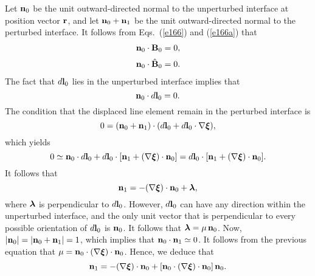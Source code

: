 \documentclass[12pt,prb,aps,notitlepage]{revtex4-1}
\newcommand{\bxi}{\mbox{\boldmath$\xi$}}
\newcommand{\blambda}{\mbox{\boldmath$\lambda$}}
\begin{document}
Let ${\bf n}_0$ be the unit outward-directed normal to the unperturbed interface at position vector ${\bf r}$, and let
${\bf n}_0+{\bf n}_1$ be the unit outward-directed normal to the perturbed interface. It follows from Eqs.~(\ref{e166}) and (\ref{e166a})
that
\begin{align}\label{e166x}
{\bf n}_0\cdot{\bf B}_0 &=0,\\[0.5ex]
{\bf n}_0\cdot\hat{\bf B}_0 &=0.\label{e166ax}
\end{align}
 The fact that $d{\bf l}_0$ lies
in the unperturbed interface implies that
\begin{equation}
{\bf n}_0\cdot d{\bf l}_0=0.
\end{equation}
The condition that the displaced
line element remain in the perturbed interface is
\begin{equation}
0=({\bf n}_0+{\bf n}_1)\cdot( d{\bf l}_0 + d{\bf l}_0\cdot\nabla\bxi),
\end{equation}
which yields
\begin{equation}
0\simeq {\bf n}_0\cdot d{\bf l}_0+d{\bf l}_0\cdot[{\bf n}_1+(\nabla\bxi)\cdot{\bf n}_0]= d{\bf l}_0\cdot[{\bf n}_1+(\nabla\bxi)\cdot{\bf n}_0].
\end{equation}
It follows that
\begin{equation}
{\bf n}_1=- (\nabla\bxi)\cdot{\bf n}_0+ \blambda,
\end{equation}
where $\blambda$ is perpendicular to $d{\bf l}_0$. However, $d{\bf l}_0$ can have any direction within the
unperturbed interface, and the only unit vector that is perpendicular to every possible orientation of  $d{\bf l}_0$ 
is ${\bf n}_0$. It follows that $\blambda= \mu\,{\bf n}_0$. Now, $|{\bf n}_0|= |{\bf n}_0+{\bf n}_1|=1$, which
implies that ${\bf n}_0\cdot{\bf n}_1\simeq 0$. It follows from the previous equation that
$\mu= {\bf n}_0\cdot(\nabla\bxi)\cdot{\bf n}_0$. Hence, we deduce that
\begin{equation}\label{e181}
{\bf n}_1 = - (\nabla\bxi)\cdot{\bf n}_0 + [{\bf n}_0\cdot(\nabla\bxi)\cdot{\bf n}_0]\,{\bf n}_0.
\end{equation}
\end{document}
